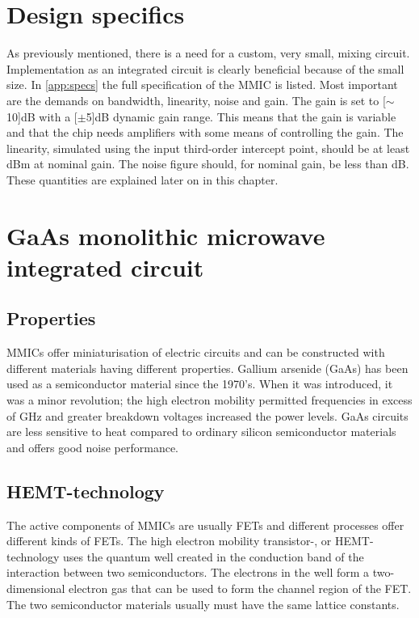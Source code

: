 	\section{Design specifics}
		As previously mentioned, there is a need for a custom, very small, mixing circuit. Implementation as an integrated circuit is clearly beneficial because of the small size. In \autoref{app:specs} the full specification of the MMIC is listed. Most important are the demands on bandwidth, linearity, noise and gain. The gain is set to \unit[$\sim$10]{dB} with a \unit[$\pm$5]{dB} dynamic gain range. This means that the gain is variable and that the chip needs amplifiers with some means of controlling the gain. The linearity, simulated using the input third-order intercept point, should be at least \unit[15]{dBm} at nominal gain. The noise figure should, for nominal gain, be less than \unit[15]{dB}. These quantities are explained later on in this chapter.


	\section{GaAs monolithic microwave integrated cir\-cuit}
		\subsection{Properties}

		MMICs offer miniaturisation of electric circuits and can be constructed with different materials having different properties. Gallium arsenide (GaAs) has been used as a semiconductor material since the 1970's. When it was introduced, it was a minor revolution; the high electron mobility permitted frequencies in excess of \unit[200]{GHz} and greater breakdown voltages increased the power levels. GaAs circuits are less sensitive to heat compared to ordinary silicon semiconductor materials and offers good noise performance.\autocite{robertson95} %

		\subsection{HEMT-technology}
			The active components of MMICs are usually FETs and different processes offer different kinds of FETs. The high electron mobility transistor-, or HEMT-technology uses the quantum well created in the conduction band of the interaction between two semiconductors. The electrons in the well form a two-dimensional electron gas that can be used to form the channel region of the FET.\autocite{mimura80} The two semiconductor materials usually must have the same lattice constants.

